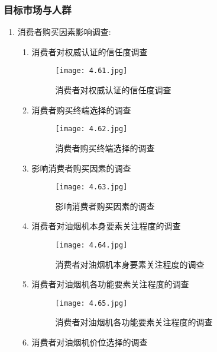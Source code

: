 \subsubsection{目标市场与人群}
\begin{enumerate}
\item 消费者购买因素影响调查:
\begin{enumerate}[(1)]
\item 消费者对权威认证的信任度调查

      \begin{figure}[H]
      \centering
      \texttt{[image: 4.61.jpg]}
      \caption{消费者对权威认证的信任度调查}
      \label{消费者对权威认证的信任度调查}
      \end{figure}

\item 消费者购买终端选择的调查

      \begin{figure}[H]
      \centering
      \texttt{[image: 4.62.jpg]}
      \caption{消费者购买终端选择的调查}
      \label{消费者购买终端选择的调查}
      \end{figure}

\item 影响消费者购买因素的调查

      \begin{figure}[H]
      \centering
      \texttt{[image: 4.63.jpg]}
      \caption{影响消费者购买因素的调查}
      \label{影响消费者购买因素的调查}
      \end{figure}

\item 消费者对油烟机本身要素关注程度的调查

      \begin{figure}[H]
      \centering
      \texttt{[image: 4.64.jpg]}
      \caption{消费者对油烟机本身要素关注程度的调查}
      \label{消费者对油烟机本身要素关注程度的调查}
      \end{figure}

\item 消费者对油烟机各功能要素关注程度的调查

      \begin{figure}[H]
      \centering
      \texttt{[image: 4.65.jpg]}
      \caption{消费者对油烟机各功能要素关注程度的调查}
      \label{消费者对油烟机各功能要素关注程度的调查}
      \end{figure}

\item 消费者对油烟机价位选择的调查


\end{enumerate}
\end{enumerate}
